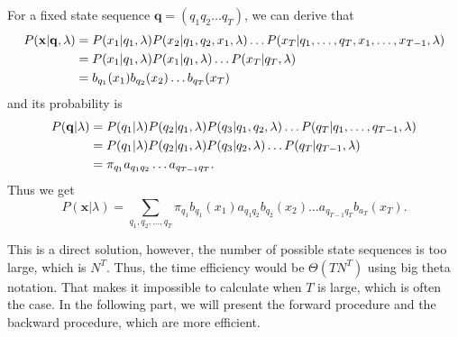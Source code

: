 \documentclass[12pt,final,twoside]{report}
\begin{document}
For a fixed state sequence $\mathbf{q} = (q_1 q_2 \dots q_T)$, we can derive that
\begin{align}
  P(\mathbf{x}|\mathbf{q},\lambda) &= P(x_1|q_1,\lambda) P(x_2|q_1,q_2,x_1,\lambda) \dots P(x_T|q_1,\dots,q_T,x_1,\dots,x_{T-1},\lambda) \notag\\
  &= P(x_1|q_1, \lambda) P(x_1|q_1, \lambda) \dots P(x_T|q_T, \lambda) \notag\\
  &= b_{q_1}(x_1) b_{q_2}(x_2) \dots b_{q_T}(x_T)
\end{align}
and its probability is
\begin{align}
  P(\mathbf{q}|\lambda) &= P(q_1|\lambda) P(q_2|q_1,\lambda) P(q_3|q_1,q_2,\lambda) \dots P(q_T|q_1,\dots,q_{T-1},\lambda) \notag\\
  &= P(q_1|\lambda) P(q_2|q_1,\lambda) P(q_3|q_2,\lambda) \dots P(q_T|q_{T-1},\lambda)  \notag\\
  &= \pi_{q_1} a_{q_1q_2} \dots a_{q_{T-1}q_T} .
\end{align}
Thus we get 
\begin{equation}
  P(\mathbf{x}|\lambda) = \sum_{q_1,q_2,\dots,q_T} \pi_{q_1} b_{q_1}(x_1) a_{q_1q_2} b_{q_2}(x_2) \dots a_{q_{T-1}q_T} b_{a_T}(x_T) .
  \label{eq:prob_brute}
\end{equation}

This is a direct solution, however, the number of possible state sequences is too large, which is $N^T$. Thus, the time efficiency would be $\Theta(T N^T)$ using big theta notation. That makes it impossible to calculate when $T$ is large, which is often the case. In the following part, we will present the forward procedure and the backward procedure, which are more efficient.
\end{document}
